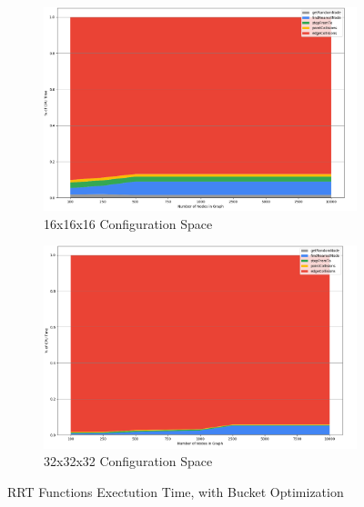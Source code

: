 \begin{figure}[H]
\begin{center}

    \begin{subfigure}{\textwidth}
    \begin{center}
    \includegraphics[draft=false,width=\linewidth,height=0.3\paperheight]{chapters/chapter2/img/profiling/16x16x16/performance2.png}
    \caption{16x16x16 Configuration Space}
    \label{subfig:16x16x16rrt2}
    \end{center}
    \end{subfigure}
    \begin{subfigure}{\textwidth}
    \begin{center}
    \includegraphics[draft=false,width=\linewidth,height=0.3\paperheight]{chapters/chapter2/img/profiling/32x32x32/performance2.png}
    \caption{32x32x32 Configuration Space}
    \label{subfig:32x32x32rrt2}
    \end{center}
    \end{subfigure}
    \caption{\ac{RRT} Functions Exectution Time, with Bucket Optimization}
    \label{fig:rrt_profiling2}
\end{center}
\end{figure}